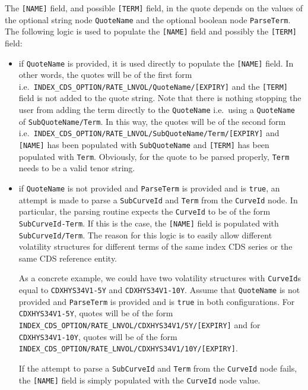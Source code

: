 \documentclass[12pt, a4paper]{article}
\begin{document}
{{The \lstinline![NAME]! field, and possible \lstinline![TERM]! field, in the quote depends on the values of the optional string node \lstinline!QuoteName! and the optional boolean node \lstinline!ParseTerm!. The following logic is used to populate the \lstinline![NAME]! field and possibly the \lstinline![TERM]! field:

\begin{itemize}
\item
if \lstinline!QuoteName! is provided, it is used directly to populate the \lstinline![NAME]! field. In other words, the quotes will be of the first form i.e.\ \lstinline!INDEX_CDS_OPTION/RATE_LNVOL/QuoteName/[EXPIRY]! and the \lstinline![TERM]! field is not added to the quote string. Note that there is nothing stopping the user from adding the term directly to the \lstinline!QuoteName! i.e.\ using a \lstinline!QuoteName! of \lstinline!SubQuoteName/Term!. In this way, the quotes will be of the second form i.e.\ \lstinline!INDEX_CDS_OPTION/RATE_LNVOL/SubQuoteName/Term/[EXPIRY]! and \lstinline![NAME]! has been populated with \lstinline!SubQuoteName! and \lstinline![TERM]! has been populated with \lstinline!Term!. Obviously, for the quote to be parsed properly, \lstinline!Term! needs to be a valid tenor string.

\item
if \lstinline!QuoteName! is not provided and \lstinline!ParseTerm! is provided and is \lstinline!true!, an attempt is made to parse a \lstinline!SubCurveId! and \lstinline!Term! from the \lstinline!CurveId! node. In particular, the parsing routine expects the \lstinline!CurveId! to be of the form \lstinline!SubCurveId-Term!. If this is the case, the \lstinline![NAME]! field is populated with \lstinline!SubCurveId/Term!. The reason for this logic is to easily allow different volatility structures for different terms of the same index CDS series or the same CDS reference entity.

As a concrete example, we could have two volatility structures with \lstinline!CurveId!s equal to \lstinline!CDXHYS34V1-5Y! and \lstinline!CDXHYS34V1-10Y!. Assume that \lstinline!QuoteName! is not provided and \lstinline!ParseTerm! is provided and is \lstinline!true! in both configurations. For \lstinline!CDXHYS34V1-5Y!, quotes will be of the form \lstinline!INDEX_CDS_OPTION/RATE_LNVOL/CDXHYS34V1/5Y/[EXPIRY]! and for \lstinline!CDXHYS34V1-10Y!, quotes will be of the form \lstinline!INDEX_CDS_OPTION/RATE_LNVOL/CDXHYS34V1/10Y/[EXPIRY]!.

If the attempt to parse a \lstinline!SubCurveId! and \lstinline!Term! from the \lstinline!CurveId! node fails, the \lstinline![NAME]! field is simply populated with the \lstinline!CurveId! node value.


\end{itemize}}}
\end{document}
